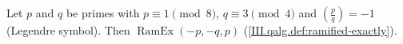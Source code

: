 Let $p$ and $q$ be primes with $p\equiv1\pmod8$, $q\equiv3\pmod4$ and $(\frac pq)=-1$ (Legendre symbol). Then
$\operatorname{RamEx}(-p,-q,p)$ (\cref{III.qalg.def:ramified-exactly}).
